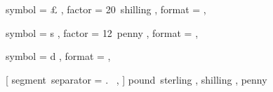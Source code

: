 

 {
	symbol = { £ } ,
	factor = { 20~shilling } ,
	format = { \SYMBOL\VALUE } ,
}

 {
	symbol = { s } ,
	factor = { 12~penny } ,
	format = { \VALUE\SYMBOL } ,
}

 {
	symbol = { d } ,
	format = { \VALUE\SYMBOL } ,
}

 [
	segment~separator = {.~} ,
] {
	pound~sterling ,
	shilling ,
	penny
}
